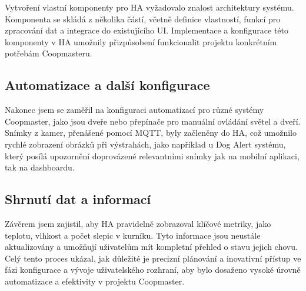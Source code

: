 Vytvoření vlastní komponenty pro HA vyžadovalo znalost architektury systému.
Komponenta se skládá z několika částí, včetně definice vlastností, funkcí pro zpracování dat a integrace do existujícího UI. Implementace a konfigurace této komponenty v HA umožnily přizpůsobení funkcionalit projektu konkrétním potřebám Coopmasteru.

\subsection*{Automatizace a další konfigurace}

Nakonec jsem se zaměřil na konfiguraci automatizací pro různé systémy Coopmaster, jako jsou dveře nebo přepínače pro manuální ovládání světel a dveří.
Snímky z kamer, přenášené pomocí MQTT, byly začleněny do HA, což umožnilo rychlé zobrazení obrázků při výstrahách, jako například u Dog Alert systému, který posílá upozornění doprovázené relevantními snímky jak na mobilní aplikaci, tak na dashboardu.

\subsection*{Shrnutí dat a informací}

Závěrem jsem zajistil, aby HA pravidelně zobrazoval klíčové metriky, jako teplotu, vlhkost a počet slepic v kurníku.
Tyto informace jsou neustále aktualizovány a umožňují uživatelům mít kompletní přehled o stavu jejich chovu.
Celý tento proces ukázal, jak důležité je precizní plánování a inovativní přístup ve fázi konfigurace a vývoje uživatelského rozhraní, aby bylo dosaženo vysoké úrovně automatizace a efektivity v projektu Coopmaster.


